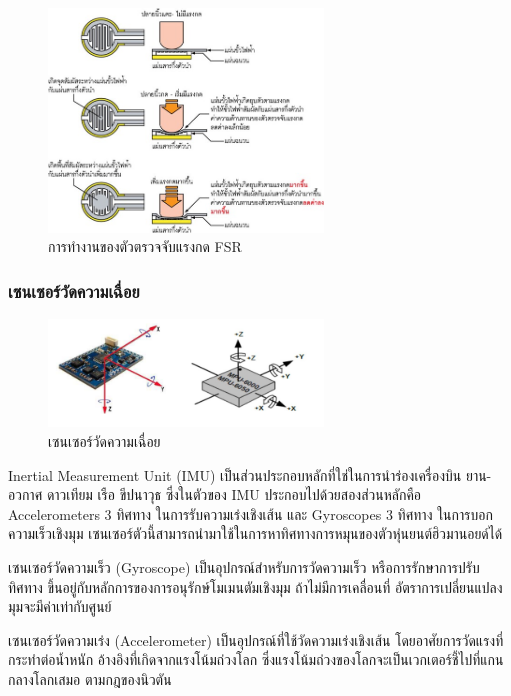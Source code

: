 \begin{figure}[htbp]
    \centering
    \includegraphics[width=0.65\textwidth]{chapter2/images/FSR.jpg}
    \caption{การทำงานของตัวตรวจจับแรงกด FSR}
    \label{fig:fsr_sensor_2}
\end{figure}

\subsubsection{เซนเซอร์วัดความเฉื่อย}

\begin{figure}[htbp]
    \centering
    \includegraphics[width=0.65\textwidth]{chapter2/images/imu.png}
    \caption{เซนเซอร์วัดความเฉื่อย}
    \label{fig:imu_sensor}
\end{figure}

Inertial Measurement Unit (IMU) เป็นส่วนประกอบหลักที่ใช่ในการนำร่องเครื่องบิน ยาน-อวกาศ ดาวเทียม เรือ
ขีปนาวุธ ซึ่งในตัวของ IMU ประกอบไปด้วยสองส่วนหลักคือ Accelerometers 3 ทิศทาง ในการรับความเร่งเชิงเส้น
และ Gyroscopes 3 ทิศทาง ในการบอกความเร็วเชิงมุม เซนเซอร์ตัวนี้สามารถนำมาใช้ในการหาทิศทางการหมุนของตัวหุ่นยนต์ฮิวมานอยด์ได้

เซนเซอร์วัดความเร็ว (Gyroscope) เป็นอุปกรณ์สำหรับการวัดความเร็ว หรือการรักษาการปรับทิศทาง ขึ้นอยู่กับหลักการของการอนุรักษ์โมเมนตัมเชิงมุม
ถ้าไม่มีการเคลื่อนที่ อัตราการเปลี่ยนแปลงมุมจะมีค่าเท่ากับศูนย์

เซนเซอร์วัดความเร่ง (Accelerometer) เป็นอุปกรณ์ที่ใช้วัดความเร่งเชิงเส้น โดยอาศัยการวัดแรงที่กระทำต่อน้ำหนัก
อ้างอิงที่เกิดจากแรงโน้มถ่วงโลก ซึ่งแรงโน้มถ่วงของโลกจะเป็นเวกเตอร์ชี้ไปที่แกนกลางโลกเสมอ ตามกฎของนิวตัน

